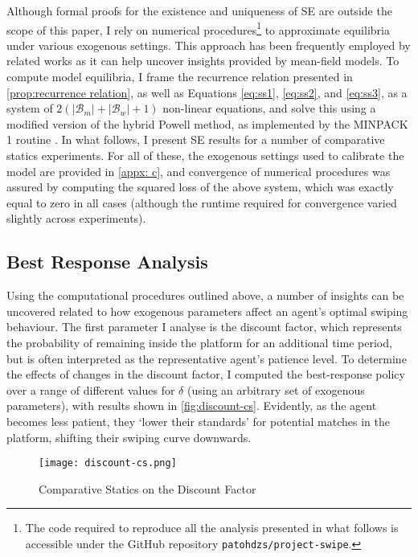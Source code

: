 Although formal proofs for the existence and uniqueness of SE are outside the scope of this paper, I rely on numerical procedures\footnote{The code required to reproduce all the analysis presented in what follows is accessible under the GitHub repository \texttt{patohdzs/project-swipe}.} to approximate equilibria under various exogenous settings. 
This approach has been frequently employed by related works \citep[see][]{iyer2014mean, gummadi2011optimal} as it can help uncover insights provided by mean-field models. 
To compute model equilibria, I frame the recurrence relation presented in \autoref{prop:recurrence relation}, as well as Equations \ref{eq:ss1}, \ref{eq:ss2}, and \ref{eq:ss3}, as a system of $2(|\mathcal{B}_m|+|\mathcal{B}_w|+1)$ non-linear equations, and solve this using a modified version of the hybrid Powell method, as implemented by the MINPACK 1 routine \citep{more1980user}. 
In what follows, I present SE results for a number of comparative statics experiments. 
For all of these, the exogenous settings used to calibrate the model are provided in \autoref{appx: c}, and convergence of numerical procedures was assured by computing the squared loss of the above system, which was exactly equal to zero in all cases (although the runtime required for convergence varied slightly across experiments).

\subsection{Best Response Analysis}\label{sec:section3.2} 
Using the computational procedures outlined above, a number of insights can be uncovered related to how exogenous parameters affect an agent's optimal swiping behaviour. 
The first parameter I analyse is the discount factor, which represents the probability of remaining inside the platform for an additional time period, but is often interpreted as the representative agent's patience level.
To determine the effects of changes in the discount factor, I computed the best-response policy over a range of different values for $\delta$ (using an arbitrary set of exogenous parameters), with results shown in \autoref{fig:discount-cs}. 
Evidently, as the agent becomes less patient, they `lower their standards' for potential matches in the platform, shifting their swiping curve downwards. 

\begin{figure}[ht] 
    \centering
    \caption{Comparative Statics on the Discount Factor}
    \texttt{[image: discount-cs.png]}
    \label{fig:discount-cs}
\end{figure} 

